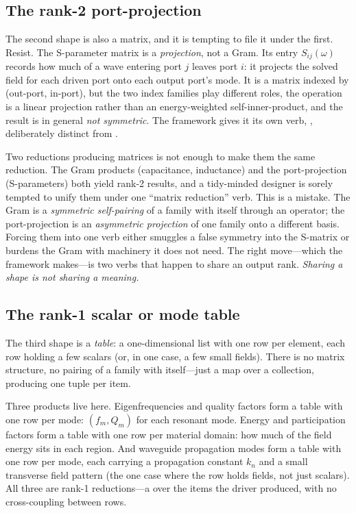 \subsection{The rank-2 port-projection}

The second shape is also a matrix, and it is tempting to file it under the
first. Resist. The S-parameter matrix is a \emph{projection}, not a Gram. Its
entry $S_{ij}(\omega)$ records how much of a wave entering port $j$ leaves port
$i$: it projects the solved field for each driven port onto each output port's
mode. It is a matrix indexed by (out-port, in-port), but the two index families
play different roles, the operation is a linear projection rather than an
energy-weighted self-inner-product, and the result is in general
\emph{not symmetric}. The framework gives it its own verb,
, deliberately distinct from .

\begin{pitfall}
Two reductions producing matrices is not enough to make them the same reduction.
The Gram products (capacitance, inductance) and the port-projection
(S-parameters) both yield rank-2 results, and a tidy-minded designer is sorely
tempted to unify them under one ``matrix reduction'' verb. This is a mistake.
The Gram is a \emph{symmetric self-pairing} of a family with itself through an
operator; the port-projection is an \emph{asymmetric projection} of one family
onto a different basis. Forcing them into one verb either smuggles a false
symmetry into the S-matrix or burdens the Gram with machinery it does not need.
The right move---which the framework makes---is two verbs that happen to share
an output rank. \emph{Sharing a shape is not sharing a meaning.}
\end{pitfall}

\subsection{The rank-1 scalar or mode table}

The third shape is a \emph{table}: a one-dimensional list with one row per
element, each row holding a few scalars (or, in one case, a few small fields).
There is no matrix structure, no pairing of a family with itself---just a map
over a collection, producing one tuple per item.

Three products live here. Eigenfrequencies and quality factors form a table with
one row per mode: $(f_m, Q_m)$ for each resonant mode. Energy and participation
factors form a table with one row per material domain: how much of the field
energy sits in each region. And waveguide propagation modes form a table with
one row per mode, each carrying a propagation constant $k_n$ and a small
transverse field pattern (the one case where the row holds fields, not just
scalars). All three are rank-1 reductions---a  over the items the
driver produced, with no cross-coupling between rows.

